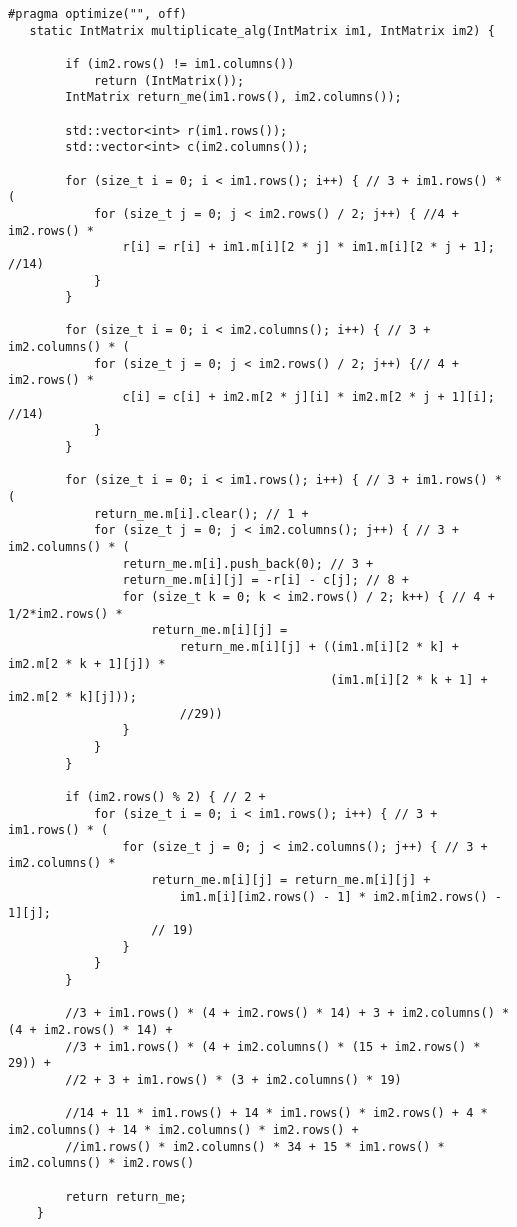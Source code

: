 \documentclass[a4paper, 14pt]{article}
\begin{document}
	\newpage
	\begin{lstlisting}[label=recur-lev,caption=Алгоритм Виноградова]
#pragma optimize("", off)
   static IntMatrix multiplicate_alg(IntMatrix im1, IntMatrix im2) {

        if (im2.rows() != im1.columns())
            return (IntMatrix());
        IntMatrix return_me(im1.rows(), im2.columns());

        std::vector<int> r(im1.rows());
        std::vector<int> c(im2.columns());

        for (size_t i = 0; i < im1.rows(); i++) { // 3 + im1.rows() * (
            for (size_t j = 0; j < im2.rows() / 2; j++) { //4 + im2.rows() *
                r[i] = r[i] + im1.m[i][2 * j] * im1.m[i][2 * j + 1]; //14)
            }
        }

        for (size_t i = 0; i < im2.columns(); i++) { // 3 + im2.columns() * (
            for (size_t j = 0; j < im2.rows() / 2; j++) {// 4 + im2.rows() *
                c[i] = c[i] + im2.m[2 * j][i] * im2.m[2 * j + 1][i]; //14)
            }
        }

        for (size_t i = 0; i < im1.rows(); i++) { // 3 + im1.rows() * (
            return_me.m[i].clear(); // 1 +
            for (size_t j = 0; j < im2.columns(); j++) { // 3 + im2.columns() * (
                return_me.m[i].push_back(0); // 3 +
                return_me.m[i][j] = -r[i] - c[j]; // 8 +
                for (size_t k = 0; k < im2.rows() / 2; k++) { // 4 + 1/2*im2.rows() *
                    return_me.m[i][j] =
                        return_me.m[i][j] + ((im1.m[i][2 * k] + im2.m[2 * k + 1][j]) *
                                             (im1.m[i][2 * k + 1] + im2.m[2 * k][j]));
                        //29))
                }
            }
        }

        if (im2.rows() % 2) { // 2 +
            for (size_t i = 0; i < im1.rows(); i++) { // 3 + im1.rows() * (
                for (size_t j = 0; j < im2.columns(); j++) { // 3 + im2.columns() *
                    return_me.m[i][j] = return_me.m[i][j] +
                        im1.m[i][im2.rows() - 1] * im2.m[im2.rows() - 1][j];
                    // 19)
                }
            }
        }

        //3 + im1.rows() * (4 + im2.rows() * 14) + 3 + im2.columns() * (4 + im2.rows() * 14) +
        //3 + im1.rows() * (4 + im2.columns() * (15 + im2.rows() * 29)) +
        //2 + 3 + im1.rows() * (3 + im2.columns() * 19)

        //14 + 11 * im1.rows() + 14 * im1.rows() * im2.rows() + 4 * im2.columns() + 14 * im2.columns() * im2.rows() +
        //im1.rows() * im2.columns() * 34 + 15 * im1.rows() * im2.columns() * im2.rows()

        return return_me;
    }
	\end{lstlisting}
	
\end{document}
